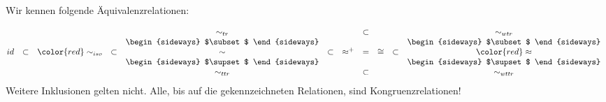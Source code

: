 \documentclass[10pt, landscape]{article}
\begin{document}

Wir kennen folgende Äquivalenzrelationen:

\newcommand{\ssubset}{\begin{sideways} $\subset$ \end{sideways}}
\newcommand{\ssupset}{\begin{sideways} $\supset$ \end{sideways}}
\newcommand{\noCongr}[1]{{\color{red}#1}}
\[\begin{array} {@{}ccccccccccc}
    &         &                      &         & \sim_{tr}  &         &        & \subset &   &         & \sim_{wtr}        \\
    &         &                      &         & \ssubset   &         &            & &       &         & \ssubset          \\
id  & \subset & \noCongr{\sim_{iso}} & \subset & \sim       & \subset &  \approx^+ &=& \cong & \subset & \noCongr{\approx} \\ 
    &         &                      &         & \ssupset   &         &            & &       &         & \ssupset          \\
    &         &                      &         & \sim_{ttr} &         &        & \subset &   &         & \sim_{wttr}       \\
\end{array}\]
Weitere Inklusionen gelten nicht. Alle, bis auf die \noCongr{gekennzeichneten} Relationen, sind Kongruenzrelationen!

%
%
%


\bigskip

\begin{minipage}{7cm}
\small
{} 
\end{minipage} \hspace{5cm}
\begin{minipage}{7cm}
\small
{}
\end{minipage}
\end{document}
